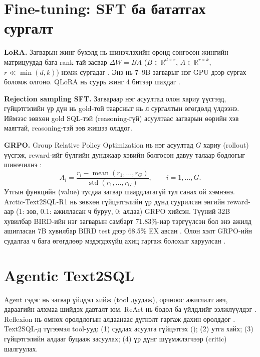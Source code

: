 \section{Fine-tuning: SFT ба бататгах сургалт}
\label{sec:finetune}

\textbf{LoRA.} Загварын жинг бүхэлд нь шинэчлэхийн оронд сонгосон жингийн матрицуудад бага rank-тай засвар $\Delta W = BA$
($B \in \mathbb{R}^{d \times r}$, $A \in \mathbb{R}^{r \times k}$, $r \ll \min(d,k)$) нэмж сургадаг \cite{hu_2022_lora}.
Энэ нь 7--9B загварыг нэг GPU дээр сургах боломж олгоно. QLoRA нь суурь жинг 4 битээр шахдаг \cite{dettmers_2023_qlora}.

\textbf{Rejection sampling SFT.} Загвараар нэг асуултад олон хариу үүсгээд, гүйцэтгэлийн үр дүн нь gold-той таарсныг
нь л сургалтын өгөгдөлд үлдээнэ. Иймээс зөвхөн gold SQL-тэй (reasoning-гүй) асуултаас загварын өөрийн хэв маягтай, reasoning-тэй зөв жишээ олддог.

\textbf{GRPO.} Group Relative Policy Optimization нь нэг асуултад $G$ хариу (rollout) үүсгэж, reward-ийг бүлгийн
дунджаар хэвийн болгосон давуу талаар бодлогыг шинэчилнэ \cite{shao_2024_deepseekmath}:
\begin{equation}
A_i = \frac{r_i - \operatorname{mean}(r_1,\dots,r_G)}{\operatorname{std}(r_1,\dots,r_G)}, \qquad i = 1,\dots,G.
\label{eq:grpo}
\end{equation}
Утгын функцийн (value) тусдаа загвар шаардлагагүй тул санах ой хэмнэнэ. Arctic-Text2SQL-R1 нь зөвхөн гүйцэтгэлийн
үр дүнд суурилсан энгийн reward-аар (1: зөв, 0.1: ажилласан ч буруу, 0: алдаа) GRPO хийсэн. Түүний 32B хувилбар
BIRD-ийн нэг загварын самбарт 71.83\%-иар тэргүүлсэн бол энэ ажилд ашигласан 7B хувилбар BIRD test дээр 68.5\% EX
авсан \cite{yao_2025_arctic_text2sql_r1}. Олон хэлт GRPO-ийн судалгаа ч бага өгөгдлөөр мэдэгдэхүйц
ахиц гаргаж болохыг харуулсан \cite{kattamuri_2025_contrastive_grpo}.

\section{Agentic Text2SQL}
\label{sec:agentic}

Agent гэдэг нь загвар үйлдэл хийж (tool дуудаж), орчноос ажиглалт авч, дараагийн алхмаа шийдэх давталт юм. ReAct нь
бодол ба үйлдлийг ээлжлүүлдэг \cite{yao_2023_react}. Reflexion нь өмнөх оролдлогын алдаанаас дүгнэлт гаргаж дахин
оролддог \cite{shinn_2023_reflexion}. Text2SQL-д түгээмэл tool-ууд:
(1) судлах асуулга гүйцэтгэх ();
(2) утга хайх;
(3) гүйцэтгэлийн алдааг буцааж засуулах;
(4) үр дүнг шүүмжлэгчээр (critic) шалгуулах.

